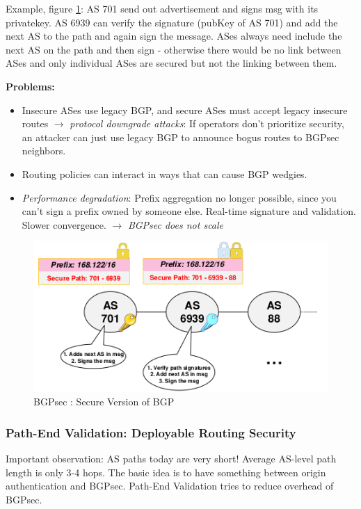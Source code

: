 \documentclass[11pt,oneside,a4paper]{article}
\begin{document}
Example, figure \ref{fig:bgpsec}: AS 701 send out advertisement and signs msg with its privatekey. AS 6939 can verify the signature (pubKey of AS 701) and add the next AS to the path and again sign the message. ASes always need include the next AS on the path and then sign - otherwise there would be no link between ASes and only individual ASes are secured but not the linking between them.

\textbf{Problems:}

\vspace{-\topsep}
\begin{itemize}
	\setlength{\itemsep}{0pt}
	\setlength{\parskip}{0pt}
	\item Insecure ASes use legacy BGP, and secure ASes must accept legacy insecure routes $\rightarrow$ \textit{protocol downgrade attacks}: If operators don’t prioritize security, an attacker can just use legacy BGP to announce bogus routes to BGPsec neighbors.
	\item Routing policies can interact in ways that can cause BGP wedgies.
	\item \textit{Performance degradation}: Prefix aggregation no longer possible, since you can't sign a prefix owned by someone else. Real-time signature and validation. Slower convergence.
	\subitem $\rightarrow$ \textit{BGPsec does not scale}
\end{itemize}
\vspace{-\topsep}

\begin{figure}
	\centering
	\includegraphics[width=0.5\linewidth]{figures/bgpsec}
	\caption{BGPsec : Secure Version of BGP}
	\label{fig:bgpsec}
\end{figure}

\subsubsection{Path-End Validation: Deployable Routing Security}

Important observation: AS paths today are very short! Average AS-level path length is only 3-4 hops. The basic idea is to have something between origin authentication and BGPsec. Path-End Validation tries to reduce overhead of BGPsec.\\
\end{document}
